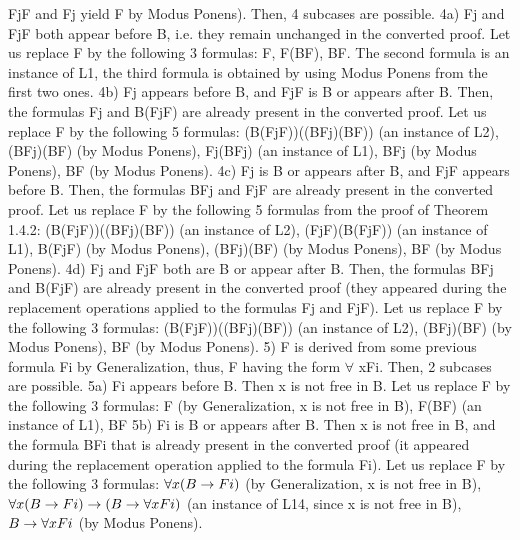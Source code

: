 Fj\IMPLIES F and Fj yield F by Modus Ponens). Then, 4 subcases are possible.
4a) Fj and Fj\IMPLIES F both appear before B, i.e. they remain unchanged in the converted proof. Let us replace
F by the following 3 formulas: F, F\IMPLIES (B\IMPLIES F), B\IMPLIES F. The second formula is an instance of L1, the third
formula is obtained by using Modus Ponens from the first two ones.
4b) Fj appears before B, and Fj\IMPLIES F is B or appears after B. Then, the formulas Fj and B\IMPLIES (Fj\IMPLIES F) are
already present in the converted proof. Let us replace F by the following 5 formulas:
(B\IMPLIES (Fj\IMPLIES F))\IMPLIES ((B\IMPLIES Fj)\IMPLIES (B\IMPLIES F)) (an instance of L2),
(B\IMPLIES Fj)\IMPLIES (B\IMPLIES F) (by Modus Ponens),
Fj\IMPLIES (B\IMPLIES Fj) (an instance of L1),
B\IMPLIES Fj (by Modus Ponens),
B\IMPLIES F (by Modus Ponens).
4c) Fj is B or appears after B, and Fj\IMPLIES F appears before B. Then, the formulas B\IMPLIES Fj and Fj\IMPLIES F are
already present in the converted proof. Let us replace F by the following 5 formulas from the proof of
Theorem 1.4.2:
(B\IMPLIES (Fj\IMPLIES F))\IMPLIES ((B\IMPLIES Fj)\IMPLIES (B\IMPLIES F)) (an instance of L2),
(Fj\IMPLIES F)\IMPLIES (B\IMPLIES (Fj\IMPLIES F)) (an instance of L1),
B\IMPLIES (Fj\IMPLIES F) (by Modus Ponens),
(B\IMPLIES Fj)\IMPLIES (B\IMPLIES F) (by Modus Ponens),
B\IMPLIES F (by Modus Ponens).
4d) Fj and Fj\IMPLIES F both are B or appear after B. Then, the formulas B\IMPLIES Fj and B\IMPLIES (Fj\IMPLIES F) are already
present in the converted proof (they appeared during the replacement operations applied to the formulas
Fj and Fj\IMPLIES F). Let us replace F by the following 3 formulas:
(B\IMPLIES (Fj\IMPLIES F))\IMPLIES ((B\IMPLIES Fj)\IMPLIES (B\IMPLIES F)) (an instance of L2),
(B\IMPLIES Fj)\IMPLIES (B\IMPLIES F) (by Modus Ponens),
B\IMPLIES F (by Modus Ponens).
5) F is derived from some previous formula Fi by Generalization, thus, F having the form \(\forall\) xFi. Then, 2
subcases are possible.
5a) Fi appears before B. Then x is not free in B. Let us replace F by the following 3 formulas:
F (by Generalization, x is not free in B),
F\IMPLIES (B\IMPLIES F) (an instance of L1),
B\IMPLIES F
5b) Fi is B or appears after B. Then x is not free in B, and the formula B\IMPLIES Fi that is already present in the
converted proof (it appeared during the replacement operation applied to the formula Fi). Let us replace F
by the following 3 formulas:
\(\forall x(B\rightarrow Fi)\) (by Generalization, x is not free in B),
\(\forall x(B\rightarrow Fi)\rightarrow (B\rightarrow \forall xFi)\) (an instance of L14, since x is not free in B),
\(B\rightarrow \forall xFi\) (by Modus Ponens).

